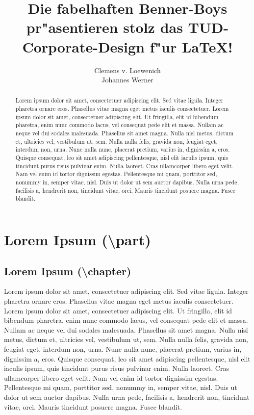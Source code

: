 \documentclass[nochapterpage,bigchapter,linedtoc,longdoc,colorback,accentcolor=tud4c]{tudreport}
\title{Die fabelhaften Benner-Boys pr"asentieren
  stolz das TUD-\\Corporate-Design f"ur {\LaTeX}!}
\subtitle{Clemens v. Loewenich\\Johannes Werner}
\begin{document}
\maketitle
\begin{abstract}
    Lorem ipsum dolor sit amet, consectetuer adipiscing elit. Sed vitae ligula. Integer pharetra ornare eros. Phasellus vitae magna eget metus iaculis consectetuer. Lorem ipsum dolor sit amet, consectetuer adipiscing elit. Ut fringilla, elit id bibendum pharetra, enim nunc commodo lacus, vel consequat pede elit et massa. Nullam ac neque vel dui sodales malesuada. Phasellus sit amet magna. Nulla nisl metus, dictum et, ultricies vel, vestibulum ut, sem. Nulla nulla felis, gravida non, feugiat eget, interdum non, urna. Nunc nulla nunc, placerat pretium, varius in, dignissim a, eros. Quisque consequat, leo sit amet adipiscing pellentesque, nisl elit iaculis ipsum, quis tincidunt purus risus pulvinar enim. Nulla laoreet. Cras ullamcorper libero eget velit. Nam vel enim id tortor dignissim egestas. Pellentesque mi quam, porttitor sed, nonummy in, semper vitae, nisl. Duis ut dolor ut sem auctor dapibus. Nulla urna pede, facilisis a, hendrerit non, tincidunt vitae, orci. Mauris tincidunt posuere magna. Fusce blandit.
\end{abstract}  

\tableofcontents
\part{Lorem Ipsum (\textbackslash part)\label{part_lorem}}

  \chapter{Lorem Ipsum (\textbackslash chapter)}

    Lorem ipsum dolor sit amet, consectetuer adipiscing elit. Sed vitae ligula. Integer pharetra ornare eros. Phasellus vitae magna eget metus iaculis consectetuer. Lorem ipsum dolor sit amet, consectetuer adipiscing elit. Ut fringilla, elit id bibendum pharetra, enim nunc commodo lacus, vel consequat pede elit et massa. Nullam ac neque vel dui sodales malesuada. Phasellus sit amet magna. Nulla nisl metus, dictum et, ultricies vel, vestibulum ut, sem. Nulla nulla felis, gravida non, feugiat eget, interdum non, urna. Nunc nulla nunc, placerat pretium, varius in, dignissim a, eros. Quisque consequat, leo sit amet adipiscing pellentesque, nisl elit iaculis ipsum, quis tincidunt purus risus pulvinar enim. Nulla laoreet. Cras ullamcorper libero eget velit. Nam vel enim id tortor dignissim egestas. Pellentesque mi quam, porttitor sed, nonummy in, semper vitae, nisl. Duis ut dolor ut sem auctor dapibus. Nulla urna pede, facilisis a, hendrerit non, tincidunt vitae, orci. Mauris tincidunt posuere magna. Fusce blandit.
\end{document}
